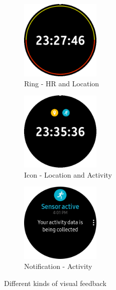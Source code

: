\documentclass[conference, a4paper, 10pt, twocolumn]{IEEEtran}
\begin{document}
\begin{figure}[t!]
    \centering
    \begin{subfigure}[t]{0.33\textwidth}
        \centering
        \includegraphics[height=1.5in]{img/ringHR&Location.png}
        \caption{Ring - HR and Location}
    \end{subfigure}%
    \begin{subfigure}[t]{0.33\textwidth}
        \centering
        \includegraphics[height=1.5in]{img/iconLocation&Activity.png}
        \caption{Icon - Location and Activity}
    \end{subfigure}
    \begin{subfigure}[t]{0.33\textwidth}
        \centering
        \includegraphics[height=1.5in]{img/notificationActifity.png}
        \caption{Notification - Activity}
    \end{subfigure}
    \caption{Different kinds of visual feedback}
    \label{visualFeedbackImage}
\end{figure}
\end{document}
